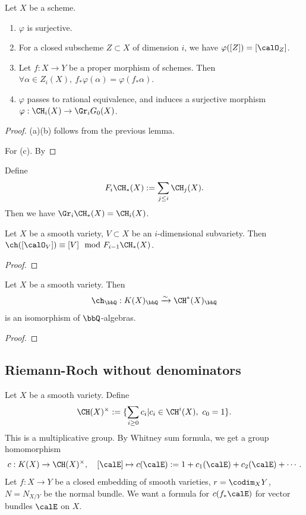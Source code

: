   \begin{proposition}
    Let $X$ be a scheme. 
    \begin{enumerate}
      \item $\varphi$ is surjective.
      \item For a closed subscheme $Z \subset X$ of dimension $i$, we have $\varphi([Z]) = [\calO_Z]$.
      \item Let $f:X \to Y$ be a proper morphism of schemes. 
        Then $\forall \alpha \in Z_i(X),\  f_* \varphi(\alpha) = \varphi(f_* \alpha)$.
      \item $\varphi$ passes to rational equivalence, and induces a surjective morphism $\varphi: \CH_i(X) \to \Gr_i G_0(X)$.
    \end{enumerate}
  \end{proposition}
  \begin{proof}
    (a)(b) follows from the previous lemma.\Yang{}

    For (c).
    By 

    \Yang{}
  \end{proof}

  Define 
  \[ F_i \CH_*(X) := \sum_{j \leq i} \CH_j(X). \]
  Then we have $\Gr_i \CH_*(X) = \CH_i(X)$.

  \begin{proposition}
    Let $X$ be a smooth variety, $V \subset X$ be an $i$-dimensional subvariety.
    Then $\ch([\calO_V]) \equiv [V] \mod F_{i-1} \CH_*(X)$.
  \end{proposition}
  \begin{proof}


    \Yang{}
  \end{proof}

  \begin{theorem}
    Let $X$ be a smooth variety.
    Then 
    \[ \ch_\bbQ: K(X)_\bbQ \xrightarrow{\sim} \CH^*(X)_\bbQ \]
    is an isomorphism of $\bbQ$-algebras.
    \Yang{}
  \end{theorem}
  \begin{proof}
    \Yang{}
  \end{proof}


\subsection{Riemann-Roch without denominators}

  Let $X$ be a smooth variety.
  Define 
  \[ \CH(X)^{\times} := \{ \sum_{i \geq 0} c_i | c_i \in \CH^i(X),\ c_0 = 1 \}. \]
  This is a multiplicative group.
  By Whitney sum formula, we get a group homomorphism 
  \[ c: K(X) \to \CH(X)^{\times}, \quad [\calE] \mapsto c(\calE) := 1 + c_1(\calE) + c_2(\calE) + \cdots. \]
  Let $f: X \to Y$ be a closed embedding of smooth varieties, $r = \codim_X Y$, $N = N_{X/Y}$ be the normal bundle.
  We want a formula for $c(f_* \calE)$ for vector bundles $\calE$ on $X$.

